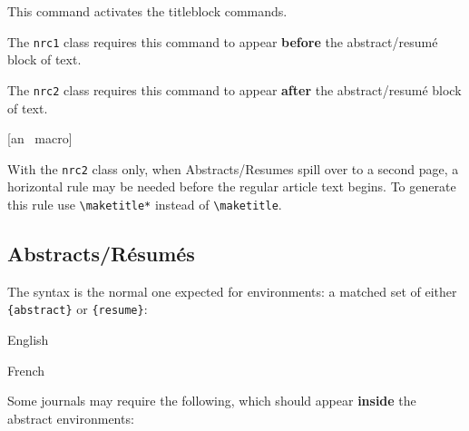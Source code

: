 \begin{description}
         This command activates the titleblock commands.

         The \verb|nrc1| class requires this command to appear
         \textbf{before} the abstract/resum\'e block of text.

         The \verb|nrc2| class requires this command to appear
         \textbf{after} the abstract/resum\'e block of text.

   \item [{\tt \blash maketitle*}] \hfill [an \NRC\ macro]\mbox{}

         With the \verb|nrc2| class only, when Abstracts/Resumes spill
         over to a second page, a horizontal rule may be needed before
         the regular article text begins. To generate this rule use
         \verb|\maketitle*| instead of \verb|\maketitle|.
\end{description}


\subsection{Abstracts/R\'esum\'es}

The syntax is the normal one expected for environments: a matched set
of either \verb|{abstract}| or \verb|{resume}|:

\begin{description} \itemsep=0pt
   \item [{\tt \blash begin\char`\{abstract\char`\}\ ... \blash
         end\char`\{abstract\char`\}}]  \hfill English

   \item [{\tt \blash begin\char`\{resume\char`\}\ ... \blash
         end\char`\{resume\char`\}}]    \hfill French
\end{description}

\noindent Some journals may require the following, which should appear
\textbf{inside} the abstract environments:


